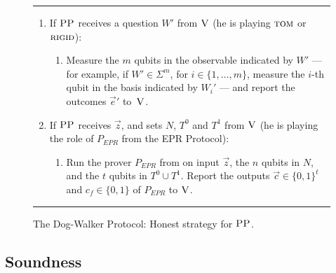\documentclass{toc}
\newcommand{\rigid}{\textsc{rigid}}
\newcommand{\tom}{\textsc{tom}}
\newcommand{\ver}{\textsc{V}}
\newcommand{\pp}{\textsc{PP}}
\begin{document}
\begin{figure}[H]
\rule[1ex]{\textwidth}{0.5pt}
\vspace{-20pt}
\begin{enumerate}
  \item If $\pp$ receives a question ${W}'$ from $\ver$ (he is playing $\tom$ or $\rigid$):
\begin{enumerate}
     \item[]  Measure the $m$ qubits in the observable indicated by $W'$ --- for example, if $W'\in\Sigma^m$, for $i\in \{1,\ldots,m\}$, measure the $i$-th qubit in the basis indicated by $W_i'$ --- and report
       the outcomes $\vec{e}'$ to~$\ver$.
\end{enumerate}
\item If $\pp$ receives $\vec{z}$, and sets $N$, $T^0$ and $T^1$ from $\ver$ (he is playing the role of $P_{EPR}$ from the EPR Protocol):
\begin{enumerate}
     \item[] Run the prover $P_{EPR}$ from  on input $\vec{z}$, the $n$ qubits in $N$, and the $t$ qubits in $T^0\cup T^1$.
     Report the outputs $\vec{c}\in\{0,1\}^t$ and $c_f\in\{0,1\}$ of $P_{EPR}$  to $\ver$. 
\end{enumerate}
\end{enumerate}
\rule[2ex]{\textwidth}{0.5pt}\vspace{-.5cm}
\caption{The Dog-Walker Protocol: Honest strategy for $\pp$.}\label{fig:dogwalker-protocol-PP}
\end{figure}




\subsection{Soundness}
\end{document}

